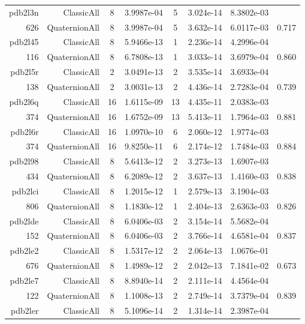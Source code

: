 \begin{xltabular}{\textwidth}{r|rcS[table-format=1.4e+2]cS[table-format=1.3e+2]S[table-format=1.4e+2]S[table-format=-1.3]}
pdb2l3n & ClassicAll & 8 & 3.9987e-04 & 5 & 3.024e-14 & 8.3802e-03 & \\
626 & QuaternionAll & 8 & 3.9987e-04 & 5 & 3.632e-14 & 6.0117e-03 & 0.717\\  \addlinespace
pdb2l45 & ClassicAll & 8 & 5.9466e-13 & 1 & 2.236e-14 & 4.2996e-04 & \\
116 & QuaternionAll & 8 & 6.7808e-13 & 1 & 3.033e-14 & 3.6979e-04 & 0.860\\  \addlinespace
pdb2l5r & ClassicAll & 2 & 3.0491e-13 & 2 & 3.535e-14 & 3.6933e-04 & \\
138 & QuaternionAll & 2 & 3.0031e-13 & 2 & 4.436e-14 & 2.7283e-04 & 0.739\\  \addlinespace
pdb2l6q & ClassicAll & 16 & 1.6115e-09 & 13 & 4.435e-11 & 2.0383e-03 & \\
374 & QuaternionAll & 16 & 1.6752e-09 & 13 & 5.413e-11 & 1.7964e-03 & 0.881\\  \addlinespace
pdb2l6r & ClassicAll & 16 & 1.0970e-10 & 6 & 2.060e-12 & 1.9774e-03 & \\
374 & QuaternionAll & 16 & 9.8250e-11 & 6 & 2.174e-12 & 1.7484e-03 & 0.884\\  \addlinespace
pdb2l98 & ClassicAll & 8 & 5.6413e-12 & 2 & 3.273e-13 & 1.6907e-03 & \\
434 & QuaternionAll & 8 & 6.2089e-12 & 2 & 3.637e-13 & 1.4160e-03 & 0.838\\  \addlinespace
pdb2lci & ClassicAll & 8 & 1.2015e-12 & 1 & 2.579e-13 & 3.1904e-03 & \\
806 & QuaternionAll & 8 & 1.1830e-12 & 1 & 2.404e-13 & 2.6363e-03 & 0.826\\  \addlinespace
pdb2lde & ClassicAll & 8 & 6.0406e-03 & 2 & 3.154e-14 & 5.5682e-04 & \\
152 & QuaternionAll & 8 & 6.0406e-03 & 2 & 3.766e-14 & 4.6581e-04 & 0.837\\  \addlinespace
pdb2le2 & ClassicAll & 8 & 1.5317e-12 & 2 & 2.064e-13 & 1.0676e-01 & \\
676 & QuaternionAll & 8 & 1.4989e-12 & 2 & 2.042e-13 & 7.1841e-02 & 0.673\\  \addlinespace
pdb2le7 & ClassicAll & 8 & 8.8940e-14 & 2 & 2.111e-14 & 4.4564e-04 & \\
122 & QuaternionAll & 8 & 1.1008e-13 & 2 & 2.749e-14 & 3.7379e-04 & 0.839\\  \addlinespace
pdb2ler & ClassicAll & 8 & 5.1096e-14 & 2 & 1.314e-14 & 2.3987e-04 & \\

\end{xltabular}
